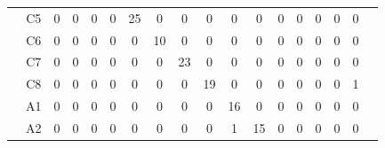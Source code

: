 \documentclass[12pt]{article}
\begin{document}
\begin{table}[!ht]
{\begin{tabular}{cccccccccccccccccc}
			& \multicolumn{1}{c|}{C5} & \multicolumn{1}{c|}{0} & \multicolumn{1}{c|}{0} & \multicolumn{1}{c|}{0} & \multicolumn{1}{c|}{0}  & \multicolumn{1}{c|}{25} & \multicolumn{1}{c|}{0}  & \multicolumn{1}{c|}{0}  & \multicolumn{1}{c|}{0}  & \multicolumn{1}{c|}{0}  & \multicolumn{1}{c|}{0}  & \multicolumn{1}{c|}{0}  & \multicolumn{1}{c|}{0}  & \multicolumn{1}{c|}{0}  & \multicolumn{1}{c|}{0}  & \multicolumn{1}{c|}{0} &  \\ \cline{3-17}
			& \multicolumn{1}{c|}{C6} & \multicolumn{1}{c|}{0} & \multicolumn{1}{c|}{0} & \multicolumn{1}{c|}{0} & \multicolumn{1}{c|}{0}  & \multicolumn{1}{c|}{0}  & \multicolumn{1}{c|}{10} & \multicolumn{1}{c|}{0}  & \multicolumn{1}{c|}{0}  & \multicolumn{1}{c|}{0}  & \multicolumn{1}{c|}{0}  & \multicolumn{1}{c|}{0}  & \multicolumn{1}{c|}{0}  & \multicolumn{1}{c|}{0}  & \multicolumn{1}{c|}{0}  & \multicolumn{1}{c|}{0} &  \\ \cline{3-17}
			& \multicolumn{1}{c|}{C7} & \multicolumn{1}{c|}{0} & \multicolumn{1}{c|}{0} & \multicolumn{1}{c|}{0} & \multicolumn{1}{c|}{0}  & \multicolumn{1}{c|}{0}  & \multicolumn{1}{c|}{0}  & \multicolumn{1}{c|}{23} & \multicolumn{1}{c|}{0}  & \multicolumn{1}{c|}{0}  & \multicolumn{1}{c|}{0}  & \multicolumn{1}{c|}{0}  & \multicolumn{1}{c|}{0}  & \multicolumn{1}{c|}{0}  & \multicolumn{1}{c|}{0}  & \multicolumn{1}{c|}{0} &  \\ \cline{3-17}
			& \multicolumn{1}{c|}{C8} & \multicolumn{1}{c|}{0} & \multicolumn{1}{c|}{0} & \multicolumn{1}{c|}{0} & \multicolumn{1}{c|}{0}  & \multicolumn{1}{c|}{0}  & \multicolumn{1}{c|}{0}  & \multicolumn{1}{c|}{0}  & \multicolumn{1}{c|}{19} & \multicolumn{1}{c|}{0}  & \multicolumn{1}{c|}{0}  & \multicolumn{1}{c|}{0}  & \multicolumn{1}{c|}{0}  & \multicolumn{1}{c|}{0}  & \multicolumn{1}{c|}{0}  & \multicolumn{1}{c|}{1} &  \\ \cline{3-17}
			& \multicolumn{1}{c|}{A1} & \multicolumn{1}{c|}{0} & \multicolumn{1}{c|}{0} & \multicolumn{1}{c|}{0} & \multicolumn{1}{c|}{0}  & \multicolumn{1}{c|}{0}  & \multicolumn{1}{c|}{0}  & \multicolumn{1}{c|}{0}  & \multicolumn{1}{c|}{0}  & \multicolumn{1}{c|}{16} & \multicolumn{1}{c|}{0}  & \multicolumn{1}{c|}{0}  & \multicolumn{1}{c|}{0}  & \multicolumn{1}{c|}{0}  & \multicolumn{1}{c|}{0}  & \multicolumn{1}{c|}{0} &  \\ \cline{3-17}
			& \multicolumn{1}{c|}{A2} & \multicolumn{1}{c|}{0} & \multicolumn{1}{c|}{0} & \multicolumn{1}{c|}{0} & \multicolumn{1}{c|}{0}  & \multicolumn{1}{c|}{0}  & \multicolumn{1}{c|}{0}  & \multicolumn{1}{c|}{0}  & \multicolumn{1}{c|}{0}  & \multicolumn{1}{c|}{1}  & \multicolumn{1}{c|}{15} & \multicolumn{1}{c|}{0}  & \multicolumn{1}{c|}{0}  & \multicolumn{1}{c|}{0}  & \multicolumn{1}{c|}{0}  & \multicolumn{1}{c|}{0} &  \\ \cline{3-17}

\end{tabular}}
\end{table}
\end{document}
